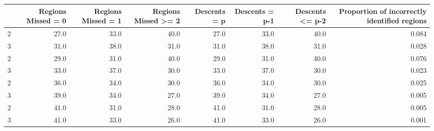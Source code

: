 \begin{tabular}{lrrrrrrr}
\toprule
{} &  Regions Missed = 0 &  Regions Missed = 1 &  Regions Missed >= 2 &  Descents = p &  Descents = p-1 &  Descents <= p-2 &  Proportion of incorrectly identified regions \\
\midrule
2 &                27.0 &                33.0 &                 40.0 &          27.0 &            33.0 &             40.0 &                                         0.084 \\
3 &                31.0 &                38.0 &                 31.0 &          31.0 &            38.0 &             31.0 &                                         0.028 \\
2 &                29.0 &                31.0 &                 40.0 &          29.0 &            31.0 &             40.0 &                                         0.076 \\
3 &                33.0 &                37.0 &                 30.0 &          33.0 &            37.0 &             30.0 &                                         0.023 \\
2 &                36.0 &                34.0 &                 30.0 &          36.0 &            34.0 &             30.0 &                                         0.025 \\
3 &                39.0 &                34.0 &                 27.0 &          39.0 &            34.0 &             27.0 &                                         0.005 \\
2 &                41.0 &                31.0 &                 28.0 &          41.0 &            31.0 &             28.0 &                                         0.005 \\
3 &                41.0 &                33.0 &                 26.0 &          41.0 &            33.0 &             26.0 &                                         0.001 \\
\bottomrule
\end{tabular}

